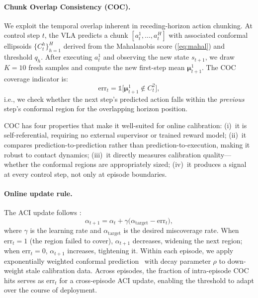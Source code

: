 \paragraph{Chunk Overlap Consistency (COC).}
We exploit the temporal overlap inherent in receding-horizon action chunking.  At control step $t$, the VLA predicts a chunk $[a_t^1,\dots,a_t^H]$ with associated conformal ellipsoids $\{C_t^h\}_{h=1}^H$ derived from the Mahalanobis score (\ref{eq:mahal}) and threshold $q_h$.  After executing $a_t^1$ and observing the new state $s_{t+1}$, we draw $K{=}10$ fresh samples and compute the new first-step mean $\boldsymbol{\mu}_{t+1}^1$.  The COC coverage indicator is:
\begin{equation}
  \mathrm{err}_t = \mathbb{1}\bigl[\boldsymbol{\mu}_{t+1}^1 \notin C_t^2\bigr],
  \label{eq:coc}
\end{equation}
i.e., we check whether the next step's predicted action falls within the \emph{previous} step's conformal region for the overlapping horizon position.

COC has four properties that make it well-suited for online calibration:
(i)~it is self-referential, requiring no external supervisor or trained reward model;
(ii)~it compares prediction-to-prediction rather than prediction-to-execution, making it robust to contact dynamics;
(iii)~it directly measures calibration quality---whether the conformal regions are appropriately sized;
(iv)~it produces a signal at every control step, not only at episode boundaries.

\paragraph{Online update rule.}
The ACI update follows \cite{gibbs2021aci}:
\begin{equation}
  \alpha_{t+1} = \alpha_t + \gamma\bigl(\alpha_{\mathrm{target}} - \mathrm{err}_t\bigr),
  \label{eq:aci_update}
\end{equation}
where $\gamma$ is the learning rate and $\alpha_{\mathrm{target}}$ is the desired miscoverage rate.  When $\mathrm{err}_t{=}1$ (the region failed to cover), $\alpha_{t+1}$ decreases, widening the next region; when $\mathrm{err}_t{=}0$, $\alpha_{t+1}$ increases, tightening it.  Within each episode, we apply exponentially weighted conformal prediction~\cite{barber2023conformal} with decay parameter $\rho$ to down-weight stale calibration data.  Across episodes, the fraction of intra-episode COC hits serves as $\mathrm{err}_t$ for a cross-episode ACI update, enabling the threshold to adapt over the course of deployment.


